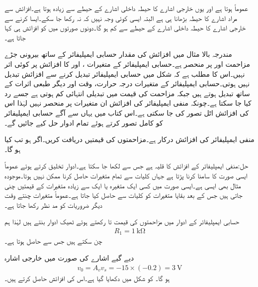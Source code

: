عموماً  ہوتا ہے اور یوں خارجی اشارے کا حیطہ داخلی اشارے کے حیطے سے زیادہ ہوتا ہے۔افزائش سے مراد اشارے کا حیطہ بڑھانا ہی ہے البتہ ایسی کوئی وجہ نہیں کہ  نہ رکھا جا سکے۔ایسا کرنے سے خارجی اشارے کا حیطہ داخلی اشارے کے حیطے سے کم ہو گا۔دونوں صورتوں میں  کو افزائش ہی کہا جاتا ہے۔

مندرجہ بالا مثال میں افزائش  کی مقدار حسابی ایمپلیفائر کے ساتھ بیرونی جڑے مزاحمت  اور  پر منحصر ہے۔حسابی ایمپلیفائر کے  متغیرات ،  اور  کا افزائش پر کوئی اثر نہیں۔اس کا مطلب ہے کہ شکل  میں حسابی ایمپلیفائر تبدیل کرنے سے افزائش تبدیل نہیں ہوتی۔حسابی ایمپلیفائر کے متغیرات درجہ حرارت، وقت اور دیگر طبعی اثرات کے ساتھ تبدیل ہوتے ہیں جبکہ مزاحمت کی قیمت میں تبدیلی انتہائی کم ہوتی ہے جسے رد کیا جا سکتا ہے۔چونکہ منفی ایمپلیفائر کی افزائش ان متغیرات پر منحصر نہیں لہٰذا اس کی افزائش اٹل تصور کی جا سکتی ہے۔اس کتاب میں یہاں سے آگے حسابی ایمپلیفائر کو کامل تصور کرتے ہوئے تمام ادوار حل کیے جائیں گے۔

منفی ایمپلیفائر کی افزائش  درکار ہے۔مزاحمتوں کی قیمتیں دریافت کریں۔اگر  ہو تب  کیا ہو گا۔

حل:منفی ایمپلیفائر کے افزائش کا قلیہ  ہے  جس سے  لکھا جا سکتا ہے۔ادوار تخلیق کرتے ہوئے عموماً ایسی صورت کا سامنا کرنا پڑتا ہے جہاں کلیات سے تمام متغیرات حاصل کرنا ممکن نہیں ہوتا۔موجودہ مثال  بھی ایسی ہے۔ایسی صورت میں کسی ایک متغیرہ یا ایک سے زیادہ  متغیرات کے قیمتیں چنی جاتی ہیں جس کے بعد بقایا متغیرات کو کلیات سے حاصل کیا جاتا ہے۔عموماً متغیرات چنتے وقت دیگر ضروریات کو مد نظر رکھا جاتا ہے۔

حسابی ایمپلیفائر کے ادوار میں مزاحمتوں کی قیمت  تا  رکھتے ہوئے ٹھیک ادوار بنتے ہیں لہٰذا ہم
\begin{align*}
R_1=\SI{1}{\kilo\ohm}
\end{align*}
چن سکتے ہیں جس سے  حاصل ہوتا ہے۔

دیے گیے اشارے کی صورت میں خارجی اشارہ
\begin{align*}
v_0=A_v v_s = -15 \times (-0.2)=\SI{3}{\volt}
\end{align*}
ہو گا۔
 کو شکل  میں دکھایا گیا ہے۔اس کی افزائش  حاصل کرتے ہیں۔

